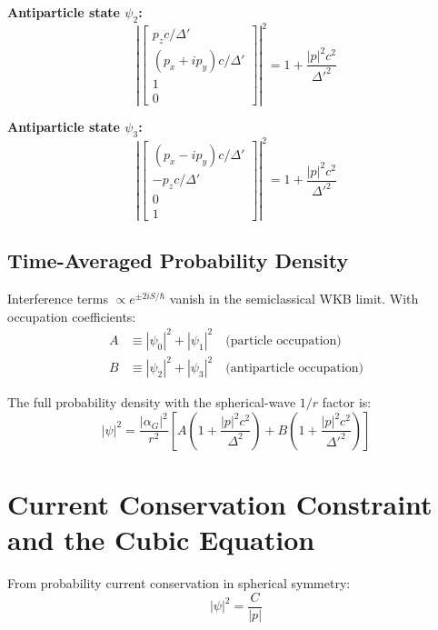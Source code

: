 \documentclass[11pt,a4paper]{article}
\theoremstyle{definition}
\theoremstyle{remark}
\begin{document}
	\textbf{Antiparticle state $\psi_2$:}
	\begin{equation}
		\left|\begin{bmatrix}p_zc/\Delta'\\ (p_x+ip_y)c/\Delta'\\1\\0\end{bmatrix}\right|^2 = 1 + \frac{|p|^2 c^2}{\Delta'^2}
		\label{eq:norm_psi2}
	\end{equation}
	
	\textbf{Antiparticle state $\psi_3$:}
	\begin{equation}
		\left|\begin{bmatrix}(p_x-ip_y)c/\Delta'\\ -p_zc/\Delta'\\0\\1\end{bmatrix}\right|^2 = 1 + \frac{|p|^2 c^2}{\Delta'^2}
		\label{eq:norm_psi3}
	\end{equation}
	
	\subsection{Time-Averaged Probability Density}
	
	Interference terms $\propto e^{\pm 2iS/\hbar}$ vanish in the semiclassical WKB limit.  With occupation coefficients:
	\begin{align}
		A &\equiv |\psi_0|^2+|\psi_1|^2 \quad\text{(particle occupation)} \\
		B &\equiv |\psi_2|^2+|\psi_3|^2 \quad\text{(antiparticle occupation)}
	\end{align}
	
	The full probability density with the spherical-wave $1/r$ factor is:
	\begin{equation}
		\boxed{
			|\psi|^2 = \frac{|\alpha_G|^2}{r^2}\!\left[A\!\left(1+\frac{|p|^2 c^2}{\Delta^2}\right)+B\!\left(1+\frac{|p|^2 c^2}{\Delta'^2}\right)\right]
		}
		\label{eq:prob_density_general}
	\end{equation}
	
	\section{Current Conservation Constraint and the Cubic Equation}
	
	From probability current conservation in spherical symmetry:
	\begin{equation}
		\boxed{|\psi|^2 = \frac{C}{|p|}}
	\end{equation}
	
\end{document}
